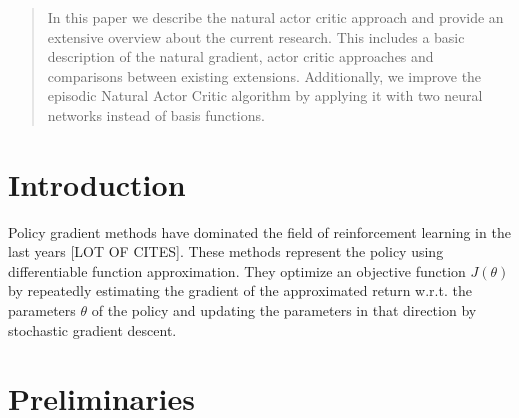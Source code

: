 \begin{abstract}
In this paper we describe the natural actor critic approach and provide an extensive overview about the current research. This includes a basic description of the natural gradient, actor critic approaches and comparisons between existing extensions. Additionally, we improve the episodic Natural Actor Critic algorithm by applying it with two neural networks instead of basis functions.



\end{abstract}


\newpage
\section{Introduction}
\label{sec:intro}

Policy gradient methods have dominated the field of reinforcement learning in the last years [LOT OF CITES]. These methods represent the policy using differentiable function approximation. They optimize an objective function $J(\theta)$ by repeatedly estimating the gradient of the approximated return w.r.t. the parameters $\theta$ of the policy and updating the parameters in that direction by stochastic gradient descent.


\section{Preliminaries}
\label{sec:preliminaries}

